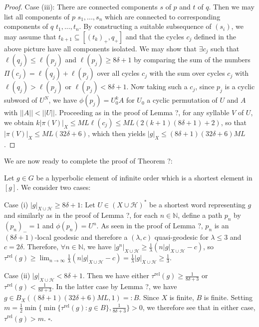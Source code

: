 \documentclass[12pt]{article}
\newcommand{\vs}{\vskip10pt}
\begin{document}
\begin{proof}
		\vs 
		
		Case (iii): There are connected components $s$ of $p$ and $t$ of $q$. Then we may list all components of $p$ $s_1,...,s_n$ which are connected to corresponding components of $q$ $t_1,...,t_n$. By constructing a suitable subsequence of $(s_i)$, we may assume that $t_{k+1} \subseteq [(t_k)_+, q_+]$ and that the cycles $c_j$ defined in the above picture have all components isolated. We may show that $\exists c_j$ such that $\ell(q_j) \leq \ell(p_j)$ and $\ell(p_j) \geq 8 \delta + 1$ by comparing the sum of the numbers $\Pi(c_j) = \ell(q_j) + \ell(p_j)$ over all cycles $c_j$ with the sum over cycles $c_j$ with $\ell(q_j) > \ell(p_j)$ or $\ell(p_j) < 8 \delta + 1$. Now taking such a $c_j$, since $p_j$ is a cyclic subword of $U^N$, we have $\phi(p_j) = U_0^k A$ for $U_0$ a cyclic permutation of $U$ and $A$ with $\vert \vert A \vert \vert < \vert \vert U \vert \vert$. Proceeding as in the proof of Lemma ?, for any syllable $V$ of $U$, we obtain $k \vert \pi(V) \vert_X \leq ML \ell(c_j) \leq ML (2(k+1)(8 \delta + 1) + 2)$, so that $\vert \pi(V) \vert_X \leq ML(32 \delta + 6)$, which then yields $\vert g \vert_X \leq (8 \delta + 1)(32 \delta + 6)ML$. 
				
	\end{proof}

	We are now ready to complete the proof of Theorem ?: 
	
	\vs 
	
	Let $g \in G$ be a hyperbolic element of infinite order which is a shortest element in $[g]$. We consider two cases: 
	
	\vs 
	
	Case (i) $\vert g \vert_{X \cup \mathcal{H}} \geq 8 \delta + 1$: Let $U \in (X \cup \mathcal{H})^*$ be a shortest word representing $g$ and similarly as in the proof of Lemma ?, for each $n \in \mathbb{N}$, define a path $p_n$ by $(p_n)_- = 1$ and $\phi(p_n) = U^n$. As seen in the proof of Lemma ?, $p_n$ is an $(8 \delta + 1)$-local geodesic and therefore a $(\lambda, c)$ quasi-geodesic for $\lambda \leq 3$ and $c = 2 \delta$. Therefore, $\forall n \in \mathbb{N}$, we have $\vert g^n \vert_{X \cup \mathcal{H}} \geq \frac{1}{\lambda}(n \vert g \vert_{X \cup \mathcal{H}} - c)$, so $\tau^{\text{rel}}(g) \geq \lim_{n \rightarrow \infty} \frac{1}{\lambda}(n \vert g \vert_{X \cup \mathcal{H}} - c) = \frac{1}{\lambda} \vert g \vert_{X \cup \mathcal{H}} \geq \frac{1}{3}$.
	
	\vs 
	
	Case (ii) $\vert g \vert_{X \cup \mathcal{H}} < 8 \delta + 1$. Then we have either $\tau^{\text{rel}}(g) \geq \frac{1}{8 \delta + 3}$ or $\tau^{\text{rel}}(g) < \frac{1}{8 \delta + 3}$. In the latter case by Lemma ?, we have $g \in B_X( (8 \delta + 1)(32 \delta + 6)ML, 1) =: B$. Since $X$ is finite, $B$ is finite. Setting $m = \frac{1}{2} \min \{\min \{\tau^{\text{rel}}(g) : g \in B\}, \frac{1}{8 \delta + 3}\} > 0$, we therefore see that in either case, $\tau^{\text{rel}}(g) > m$. $\square$.
	
\end{document}
